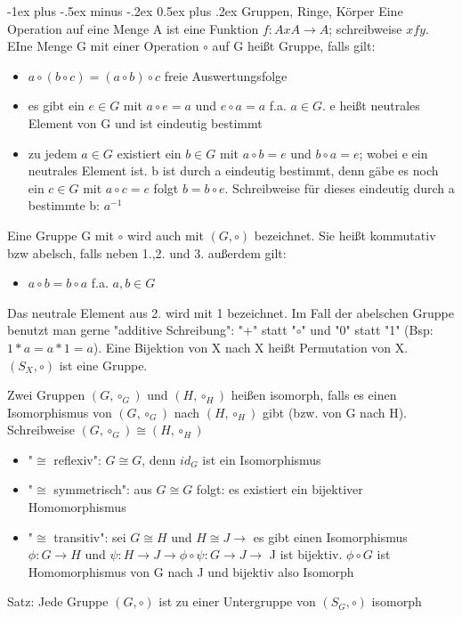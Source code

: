 \documentclass[a4paper]{article}
\makeatletter
\renewcommand{\section}{\@startsection{section}{1}{0mm}%
                                {-1ex plus -.5ex minus -.2ex}%
                                {0.5ex plus .2ex}%
                                {\normalfont\large\bfseries}}
\makeatother
\begin{document}
\begin{multicols}{3}
    \section{Gruppen, Ringe, Körper}
    Eine Operation auf eine Menge A ist eine Funktion $f:AxA\rightarrow A$; schreibweise $xfy$. EIne Menge G mit einer Operation $\circ$ auf G heißt Gruppe, falls gilt:
    \begin{itemize}
        \item $a\circ (b\circ c) = (a\circ b)\circ c$ freie Auswertungsfolge
        \item es gibt ein $e\in G$ mit $a\circ e=a$ und $e\circ a=a$ f.a. $a\in G$. e heißt neutrales Element von G und ist eindeutig bestimmt
        \item zu jedem $a\in G$ existiert ein $b\in G$ mit $a\circ b=e$ und $b\circ a=e$; wobei e ein neutrales Element ist. b ist durch a eindeutig bestimmt, denn gäbe es noch ein $c\in G$ mit $a\circ c=e$ folgt $b=b\circ e$. Schreibweise für dieses eindeutig durch a bestimmte b: $a^{-1}$
    \end{itemize}
    
    Eine Gruppe G mit $\circ$ wird auch mit $(G, \circ)$ bezeichnet. Sie heißt kommutativ bzw abelsch, falls neben 1.,2. und 3. außerdem gilt:
    \begin{itemize}
        \item $a\circ b = b\circ a$ f.a. $a,b \in G$
    \end{itemize}
    
    Das neutrale Element aus 2. wird mit 1 bezeichnet. Im Fall der abelschen Gruppe benutzt man gerne "additive Schreibung": "+" statt "$\circ$" und "0" statt "1" (Bsp: $1*a = a*1 = a$).
    Eine Bijektion von X nach X heißt Permutation von X. $(S_X, \circ)$ ist eine Gruppe.
    
    Zwei Gruppen $(G, \circ_G)$ und $(H,\circ_H)$ heißen isomorph, falls es einen Isomorphismus von $(G,\circ_G)$ nach $(H,\circ_H)$ gibt (bzw. von G nach H). Schreibweise $(G,\circ_G)\cong (H,\circ_H)$
    \begin{itemize}
        \item "$\cong$ reflexiv": $G\cong G$, denn $id_G$ ist ein Isomorphismus
        \item "$\cong$ symmetrisch": aus $G\cong G$ folgt: es existiert ein bijektiver Homomorphismus
        \item "$\cong$ transitiv": sei $G\cong H$ und $H\cong J \rightarrow$ es gibt einen Isomorphismus $\phi:G\rightarrow H$ und $\psi:H\rightarrow J \rightarrow \phi\circ \psi :G\rightarrow J \rightarrow$ J ist bijektiv. $\phi\circ G$ ist Homomorphismus von G nach J und bijektiv also Isomorph
    \end{itemize}
    Satz: Jede Gruppe $(G,\circ)$ ist zu einer Untergruppe von $(S_G, \circ)$ isomorph
    

\end{multicols}
\end{document}
